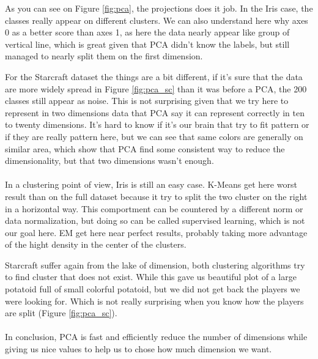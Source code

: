 \documentclass[twocolumn,a4paper,10pt]{article}
\begin{document}
As you can see on Figure \ref{fig:pca}, the projections does it job.
In the Iris case, the classes really appear on different clusters.
We can also understand here why axes 0 as a better score than axes
1, as here the data nearly appear like group of vertical line, which
is great given that PCA didn't know the labels, but still managed
to nearly split them on the first dimension.

For the Starcraft dataset the things are a bit different, if it's
sure that the data are more widely spread in Figure \ref{fig:pca_sc}
than it was before a PCA, the 200 classes still appear as noise. This
is not surprising given that we try here to represent in two dimensions
data that PCA say it can represent correctly in ten to twenty dimensions.
It's hard to know if it's our brain that try to fit pattern or if
they are really pattern here, but we can see that same colors are
generally on similar area, which show that PCA find some consistent
way to reduce the dimensionality, but that two dimensions wasn't enough.

\paragraph{}

In a clustering point of view, Iris is still an easy case. K-Means
get here worst result than on the full dataset because it try to split
the two cluster on the right in a horizontal way. This comportment
can be countered by a different norm or data normalization, but doing
so can be called supervised learning, which is not our goal here.
EM get here near perfect results, probably taking more advantage of
the hight density in the center of the clusters.

Starcraft suffer again from the lake of dimension, both clustering
algorithms try to find cluster that does not exist. While this gave
us beautiful plot of a large potatoid full of small colorful potatoid,
but we did not get back the players we were looking for. Which is
not really surprising when you know how the players are split (Figure
\ref{fig:pca_sc}).

\paragraph{}

In conclusion, PCA is fast and efficiently reduce the number of dimensions
while giving us nice values to help us to chose how much dimension
we want.
\end{document}
